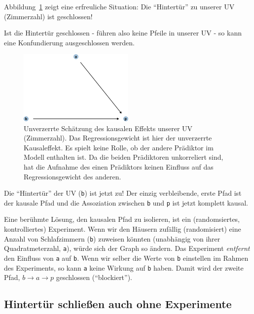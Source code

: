 \documentclass[
  a4paper,
  DIV=11]{scrreprt}
\theoremstyle{definition}
\theoremstyle{remark}
\begin{document}
Abbildung~\ref{fig-dag-tuer-zu} zeigt eine erfreuliche Situation: Die
``Hintertür'' zu unserer UV (Zimmerzahl) ist geschlossen!

Ist die Hintertür geschlossen - führen also keine Pfeile in unserer UV -
so kann eine Konfundierung ausgeschlossen werden.

\begin{figure}

{\centering \includegraphics[width=0.5\textwidth,height=\textheight]{./kausal_files/figure-pdf/fig-dag-tuer-zu-1.pdf}

}

\caption{\label{fig-dag-tuer-zu}Unverzerrte Schätzung des kausalen
Effekts unserer UV (Zimmerzahl). Das Regressionsgewicht ist hier der
unverzerrte Kausaleffekt. Es spielt keine Rolle, ob der andere Prädiktor
im Modell enthalten ist. Da die beiden Prädiktoren unkorreliert sind,
hat die Aufnahme des einen Prädiktors keinen Einfluss auf das
Regressionsgewicht des anderen.}

\end{figure}

Die ``Hintertür'' der UV (\texttt{b}) ist jetzt zu! Der einzig
verbleibende, erste Pfad ist der kausale Pfad und die Assoziation
zwischen \texttt{b} und \texttt{p} ist jetzt komplett kausal.

Eine berühmte Lösung, den kausalen Pfad zu isolieren, ist ein
(randomsiertes, kontrolliertes) Experiment. Wenn wir den Häusern
zufällig (randomisiert) eine Anzahl von Schlafzimmern (\texttt{b})
zuweisen könnten (unabhängig von ihrer Quadratmeterzahl, \texttt{a}),
würde sich der Graph so ändern. Das Experiment \emph{entfernt} den
Einfluss von \texttt{a} auf \texttt{b}. Wenn wir selber die Werte von
\texttt{b} einstellen im Rahmen des Experiments, so kann \texttt{a}
keine Wirkung auf \texttt{b} haben. Damit wird der zweite Pfad,
\(b \rightarrow a \rightarrow p\) geschlossen (``blockiert'').

\hypertarget{hintertuxfcr-schlieuxdfen-auch-ohne-experimente}{%
\subsection{Hintertür schließen auch ohne
Experimente}\label{hintertuxfcr-schlieuxdfen-auch-ohne-experimente}}
\end{document}
